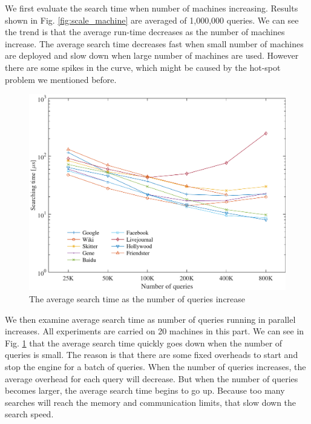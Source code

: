We first evaluate the search time when number of machines increasing. Results shown in Fig. \ref{fig:scale_machine} are averaged of 1,000,000 queries. We can see the trend is that the average run-time decreases as the number of machines increase. The average search time decreases fast when small number of machines are deployed and slow down when large number of machines are used. However there are some spikes in the curve, which might be caused by the hot-spot problem we mentioned before.

\begin{figure}[t]
    \centering
    \includegraphics[width=\linewidth]{./figures/scale_query.pdf}
    \caption{The average search time as the number of queries increase}
    \label{fig:scale_query}
\end{figure}

We then examine average search time as number of queries running in parallel increases. All experiments are carried on 20 machines in this part. We can see in Fig. \ref{fig:scale_query} that the average search time quickly goes down when the number of queries is small. The reason is that there are some fixed overheads to start and stop the engine for a batch of queries. When the number of queries increases, the average overhead for each query will decrease. But when the number of queries becomes larger, the average search time begins to go up.  Because too many searches will reach the memory and communication limits, that slow down the search speed.

